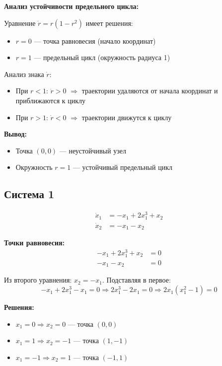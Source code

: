\textbf{Анализ устойчивости предельного цикла:}

Уравнение $\dot{r} = r(1 - r^2)$ имеет решения:
\begin{itemize}
\item $r = 0$ --- точка равновесия (начало координат)
\item $r = 1$ --- предельный цикл (окружность радиуса 1)
\end{itemize}

Анализ знака $\dot{r}$:
\begin{itemize}
\item При $r < 1$: $\dot{r} > 0$ $\Rightarrow$ траектории удаляются от начала координат и приближаются к циклу
\item При $r > 1$: $\dot{r} < 0$ $\Rightarrow$ траектории движутся к циклу
\end{itemize}

\textbf{Вывод:}
\begin{itemize}
\item Точка $(0,0)$ --- неустойчивый узел
\item Окружность $r = 1$ --- устойчивый предельный цикл
\end{itemize}

\subsection*{Система 1}

\begin{align}
\dot{x}_1 &= -x_1 + 2x_1^3 + x_2 \\
\dot{x}_2 &= -x_1 - x_2
\end{align}

\textbf{Точки равновесия:}
\begin{align}
-x_1 + 2x_1^3 + x_2 &= 0 \\
-x_1 - x_2 &= 0
\end{align}

Из второго уравнения: $x_2 = -x_1$. Подставляя в первое:
$$-x_1 + 2x_1^3 - x_1 = 0 \Rightarrow 2x_1^3 - 2x_1 = 0 \Rightarrow 2x_1(x_1^2 - 1) = 0$$

\textbf{Решения:}
\begin{itemize}
\item $x_1 = 0 \Rightarrow x_2 = 0$ --- точка $(0, 0)$
\item $x_1 = 1 \Rightarrow x_2 = -1$ --- точка $(1, -1)$
\item $x_1 = -1 \Rightarrow x_2 = 1$ --- точка $(-1, 1)$
\end{itemize}

